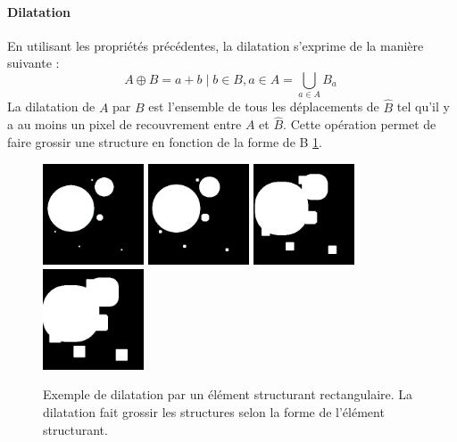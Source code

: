   \paragraph{Dilatation}
  En utilisant les propriétés précédentes, la dilatation s'exprime de la manière suivante :
  \begin{equation}
    A \oplus B = {a+b \mid b \in B, a \in A } = \bigcup_{a \in A}B_{a} \
  \end{equation}
  La dilatation de $A$ par $B$ est l'ensemble de tous les déplacements de $\widehat{B}$ tel qu'il y a au moins un pixel de recouvrement entre $A$ et $\widehat{B}$. Cette opération permet de faire grossir une structure en fonction de la forme de B \ref{fig:morpho_dilation}.
  
  \begin{figure}[h]
    \centering
    \includegraphics[height=3cm]{Images/morpho_init.png}
    \includegraphics[height=3cm]{Images/morpho_dilate_k5.png}
    \includegraphics[height=3cm]{Images/morpho_dilate_k21.png}
    \includegraphics[height=3cm]{Images/morpho_dilate_k31.png}
    \caption{Exemple de dilatation par un élément structurant rectangulaire. La dilatation fait grossir les structures selon la forme de l'élément structurant.}
    \label{fig:morpho_dilation}
  \end{figure}
  
